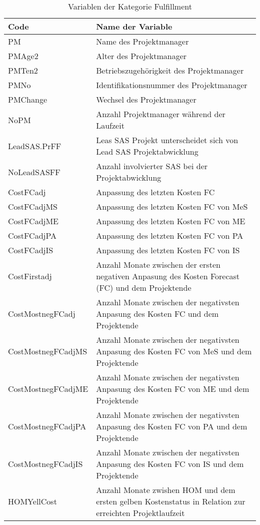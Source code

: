 \begin{longtable}[ht]{p{}p{}}
 	\caption{Variablen der Kategorie Fulfillment}\\
 	\toprule
		\textbf{Code} & \textbf{Name der Variable} \\  \endfirsthead\endhead
		\midrule
		PM    & Name des Projektmanager \\
		PMAge2 & Alter des Projektmanager \\
		PMTen2 & Betriebszugehörigkeit des Projektmanager  \\
		PMNo  & Identifikationsnummer des Projektmanager  \\
		PMChange & Wechsel des Projektmanager \\
		NoPM  & Anzahl Projektmanager während der Laufzeit \\
		LeadSAS.PrFF & Leas SAS Projekt unterscheidet sich von Lead SAS Projektabwicklung \\
		NoLeadSASFF & Anzahl involvierter SAS bei der Projektabwicklung\\
		CostFCadj & Anpassung des letzten Kosten FC \\
		CostFCadjMS & Anpassung des letzten Kosten FC von MeS \\
		CostFCadjME & Anpassung des letzten Kosten FC von ME \\
		CostFCadjPA & Anpassung des letzten Kosten FC von PA \\
		CostFCadjIS & Anpassung des letzten Kosten FC von IS \\
		CostFirstadj & Anzahl Monate zwischen der ersten  negativen Anpasung des Kosten Forecast (FC) und dem Projektende \\
		CostMostnegFCadj & Anzahl Monate zwischen der negativsten Anpasung des Kosten FC und dem Projektende \\
		CostMostnegFCadjMS & Anzahl Monate zwischen der negativsten Anpasung des Kosten FC  von MeS und dem Projektende  \\
		CostMostnegFCadjME & Anzahl Monate zwischen der negativsten Anpasung des Kosten FC  von ME und dem Projektende  \\
		CostMostnegFCadjPA & Anzahl Monate zwischen der negativsten Anpasung des Kosten FC  von PA und dem Projektende  \\
		CostMostnegFCadjIS & Anzahl Monate zwischen der negativsten Anpasung des Kosten FC  von IS und dem Projektende  \\
		HOMYellCost & Anzahl Monate zwishen HOM und dem ersten gelben Kostenstatus in Relation zur erreichten Projektlaufzeit \\

\end{longtable}
